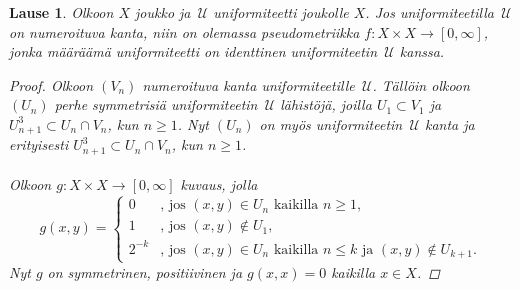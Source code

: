 \documentclass[12pt,a4paper,leqno]{report}
\newcommand{\U}{\,\mathcal{U}}
\theoremstyle{plain}
\newtheorem{lause}[equation]{Lause}
\theoremstyle{definition}
\theoremstyle{remark}
\begin{document}
\begin{lause}\label{numeroituvakantalause}
Olkoon $X$ joukko ja $\U$ uniformiteetti joukolle $X$. 
Jos uniformiteetilla $\U$ on numeroituva kanta, 
niin on olemassa pseudometriikka $f\colon X\times X\rightarrow [0,\infty]$, 
jonka määräämä uniformiteetti on identtinen uniformiteetin $\U$ kanssa.
\begin{proof}
Olkoon $(V_n)$ numeroituva kanta uniformiteetille $\U$. 
Tällöin olkoon $(U_n)$ perhe symmetrisiä uniformiteetin $\U$ lähistöjä, 
joilla $U_1\subset V_1$ ja $U_{n+1}^3\subset U_n\cap V_n$, kun $n\geq 1$. 
Nyt $(U_n)$ on myös uniformiteetin $\U$ kanta ja erityisesti 
$U_{n+1}^3\subset U_n\cap V_n$, kun $n\geq 1$. \\
\\
Olkoon $g\colon X\times X\rightarrow [0,\infty]$ kuvaus, jolla 
\begin{equation*}
g(x,y)=
\begin{cases}
0&\text{, jos }(x,y)\in U_n\text{ kaikilla }n\geq 1, \\
1&\text{, jos }(x,y)\not\in U_1, \\
2^{-k}&\text{, jos }(x,y)\in U_n\text{ kaikilla }n\leq k 
\text{ ja } (x,y)\not\in U_{k+1}.
\end{cases}
\end{equation*}
Nyt $g$ on symmetrinen, positiivinen ja $g(x,x)=0$ kaikilla $x\in X$. 


\end{proof}
\end{lause}
\end{document}
